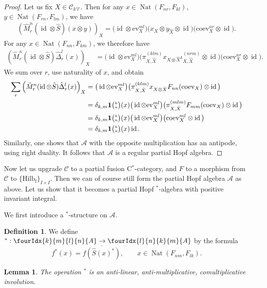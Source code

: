 \documentclass[10pt]{article}
\DeclareMathOperator{\fin}{\mathrm{f}}
\DeclareMathOperator{\id}{id}
\DeclareMathOperator{\Nat}{\mathrm{Nat}}
\newcommand{\CatCC}{\mathscr{C}}
\newcommand{\Hilb}{\mathrm{Hilb}}
\newcommand{\ev}{\mathrm{ev}}
\newcommand{\coev}{\mathrm{coev}}
\newcommand{\Grt}[3]{#1{\tiny{\begin{pmatrix} #2\\#3\end{pmatrix}}}}
\newcommand{\UnitC}[2]{\Grt{\mathbf{1}}{#1}{#2}}
\newcommand{\Gr}[5]{\fourIdx{#2}{#4}{#3}{#5}{#1}}%
\newtheorem{Lem}[Theorem]{Lemma}
\theoremstyle{definition}
\newtheorem{Def}[Theorem]{Definition}
\numberwithin{equation}{section}
\begin{document}
\begin{proof}
Let us fix $X\in \mathcal{C}_{k'l'}$. Then for any $x\in
\Nat(F_{nr},F_{kl})$, $y\in \Nat(F_{rn},F_{lm})$, we have
\begin{align*}
  \left(\hat{M}^n_r(\id\otimes \hat{S})(x\otimes y)\right)_X =
\big(\id \otimes \ev_{X}^{ml}\big)  \big(x_{X} \otimes y_{\hat X} \otimes \id\big) 
  \big(\coev_{X}^{nr} \otimes \id\big).
\end{align*}
For any $x\in \Nat(F_{nn},F_{km})$, we therefore have
\begin{align*}
  \left(\hat{M}^n_r(\id\otimes \hat{S})\hat\Delta^{l}_{r}(x)\right)_X &=
\big(\id \otimes \ev^{ml}_{X}\big)  \big(\pi^{(klm)}_{X,\hat X}x_{X\otimes \hat
    X}\iota^{(nrm)}_{X,\hat X} \otimes \id\big) 
  \big(\coev^{nr}_{X} \otimes \id\big).
\end{align*}
We sum over $r$, use naturality of $x$, and obtain
\begin{align*}
\sum_{r}    \left(\hat{M}^n_r(\id\otimes
  \hat{S})\hat\Delta^{l}_{r}(x)\right)_X &=
\big(\id \otimes \ev_{X}^{ml}\big) \big(\pi^{(klm)}_{X,\hat X}x_{X\otimes \hat
    X}F_{nn}(\coev_{X}) \otimes \id\big) \\
  &=\delta_{k,m} \UnitC{k}{n}(x)
\big(\id \otimes \ev_{X}^{ml}\big) 
\big(\pi^{(mlm)}_{X,\hat X}F_{mm}(\coev_{X})
  \otimes \id\big) \\
  &=\delta_{k,m} \UnitC{k}{n}(x)
\big(\id \otimes \ev_{X}^{ml}\big) 
\big(\coev^{ml}_{X}
  \otimes \id\big) \\
  &= \delta_{k,m} \UnitC{k}{n}(x) \id.
\end{align*}
Similarly, one shows that $\mathscr{A}$ with the opposite multiplication has an antipode, using right duality. It follows that $\mathscr{A}$ is a regular partial Hopf algebra.  
\end{proof} 

Now let us upgrade $\CatCC$ to a partial fusion C$^*$-category, and $F$ to a morphism from $\CatCC$ to $\{\Hilb_{\fin}\}_{I\times I}$. Then we can of course still form the partial Hopf algebra $\mathscr{A}$ as above. Let us show that it becomes a partial Hopf $^*$-algebra with positive invariant integral.

We first introduce a $^*$-structure on $\mathscr{A}$. 

\begin{Def} We define $^*: \Gr{A}{k}{l}{m}{n}\rightarrow \Gr{A}{l}{k}{n}{m}$ by the formula \[f^*(x) = \overline{f(\hat{S}(x)^*)},\qquad x\in \Nat(F_{nm},F_{lk}).\]
\end{Def}

\begin{Lem} The operation $^*$ is an anti-linear, anti-multiplicative, comultiplicative involution.
\end{Lem}
\end{document}
